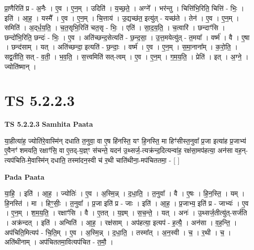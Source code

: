 \documentclass[17pt]{extarticle}
\begin{document}
प्रा॒णैरिति॑ प्र - अ॒नैः । ए॒व । ए॒न॒म् । उदिति॑ । य॒च्छ॒ते॒ । अग्ने᳚ । भर॑न्तु । चित्ति॑भि॒रिति॒ चित्ति॑ - भिः॒ । इति॑ । आ॒ह॒ । यस्मै᳚ । ए॒व । ए॒न॒म् । चि॒त्ताय॑ । उ॒द्यच्छ॑त॒ इत्यु॑त् - यच्छ॑ते । तेन॑ । ए॒व । ए॒न॒म् । समिति॑ । अ॒द्‌र्ध॒य॒ति॒ । च॒त॒सृभि॒रिति॑ चत॒सृ - भिः॒ । एति॑ । सा॒द॒य॒ति॒ । च॒त्वारि॑ । छन्दाꣳ॑सि । छन्दो॑भि॒रिति॒ छन्दः॑ - भिः॒ । ए॒व । अति॑च्छन्द॒सेत्यति॑ - छ॒न्द॒सा॒ । उ॒त्त॒मयेत्यु॑त् - त॒मया᳚ । वर्ष्म॑ । वै । ए॒षा । छन्द॑साम् । यत् । अति॑च्छन्दा॒ इत्यति॑ - छ॒न्दाः॒ । वर्ष्म॑ । ए॒व । ए॒न॒म् । स॒मा॒नाना᳚म् । क॒रो॒ति॒ । सद्व॒तीति॒ सत् - व॒ती॒ । भ॒व॒ति॒ । स॒त्त्वमिति॑ सत्-त्वम् । ए॒व । ए॒न॒म् । ग॒म॒य॒ति॒ । प्रेति॑ । इत् । अ॒ग्ने॒ । ज्योति॑ष्मान् ।  \newline





\section{ TS 5.2.2.3 }

\textbf{TS 5.2.2.3 } \newline
\textbf{Samhita Paata} \newline

या॒हीत्या॑ह॒ ज्योति॑रे॒वास्मि॑न् दधाति त॒नुवा॒ वा ए॒ष हि॑नस्ति॒ यꣳ हि॒नस्ति॒ मा हिꣳ॑सीस्त॒नुवा᳚ प्र॒जा इत्या॑ह प्र॒जाभ्य॑ ए॒वैनꣳ॑ शमयति॒ रक्षाꣳ॑सि॒ वा ए॒तद्-य॒ज्ञ्ꣳ स॑चन्ते॒ यदन॑ उ॒थ्सर्ज॒-त्यक्र॑न्द॒दित्यन्वा॑ह॒ रक्ष॑सा॒मप॑हत्या॒ अन॑सा वह॒न्-त्यप॑चिति-मे॒वास्मि॑न् दधाति॒ तस्मा॑दन॒स्वी च॑ र॒थी चाति॑थीना॒-मप॑चिततमा॒ - [  ] \newline

\textbf{Pada Paata} \newline

या॒हि॒ । इति॑ । आ॒ह॒ । ज्योतिः॑ । ए॒व । अ॒स्मि॒न्न् । द॒धा॒ति॒ । त॒नुवा᳚ । वै । ए॒षः । हि॒न॒स्ति॒ । यम् । हि॒नस्ति॑ । मा । हिꣳ॒॒सीः॒ । त॒नुवा᳚ । प्र॒जा इति॑ प्र - जाः । इति॑ । आ॒ह॒ । प्र॒जाभ्य॒ इति॑ प्र - जाभ्यः॑ । ए॒व । ए॒न॒म् । श॒म॒य॒ति॒ । रक्षाꣳ॑सि । वै । ए॒तत् । य॒ज्ञ्म् । स॒च॒न्ते॒ । यत् । अनः॑ । उ॒थ्सर्ज॒तीत्यु॑त्-सर्ज॑ति । अक्र॑न्दत् । इति॑ । अन्विति॑ । आ॒ह॒ । रक्ष॑साम् । अप॑हत्या॒ इत्यप॑ - ह॒त्यै॒ । अन॑सा । व॒ह॒न्ति॒ । अप॑चिति॒मित्यप॑ - चि॒ति॒म् । ए॒व । अ॒स्मि॒न्न् । द॒धा॒ति॒ । तस्मा᳚त् । अ॒न॒स्वी । च॒ । र॒थी । च॒ । अति॑थीनाम् । अप॑चिततमा॒वित्यप॑चित - त॒मौ॒ ।  \newline




\end{document}
